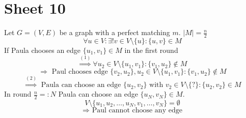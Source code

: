 \documentclass[12pt,oneside,a4paper,parskip=on,fleqn]{scrartcl}
\begin{document}
\section{Sheet 10} %
\label{sec:sheet_10}
	Let $G=(V,E)$ be a graph with a perfect matching $m$. $|M|=\frac{n}{2}$
	\begin{equation}
		\forall u\in V: \exists! v\in V\setminus\{u\}:\{u,v\}\in M
	\end{equation}
	If Paula chooses an edge $\{u_1,v_1\}\in M$ in the first round
	\[
		\overset{(1)}{\Rightarrow} \forall u_2\in V\setminus\{u_1,v_1\}:\{v_1,u_2\}\not\in M
	\]
	\[
		\Rightarrow \text{ Paul chooses edge } \{v_2,u_2\},u_2\in V\setminus\{u_1,v_1\}:\{v_1,u_2\}\not\in M
	\]
	\[
		\overset{(2)}{\Rightarrow} \text{ Paula can choose an edge } \{u_2,v_2\} \text{ with } v_2\in V\setminus\{?\}:\{u_2,v_2\}\in M
	\]
	In round $\frac{n}{2} =: N$ Paula can choose an edge $\{u_N,v_N\}\in M$.
	\[
		V\setminus\{u_1,u_2,\ldots,u_N,v_1,\ldots,v_N\}=\emptyset
	\]
	\[
		\Rightarrow \text{ Paul cannot choose any edge}
	\]
\end{document}
